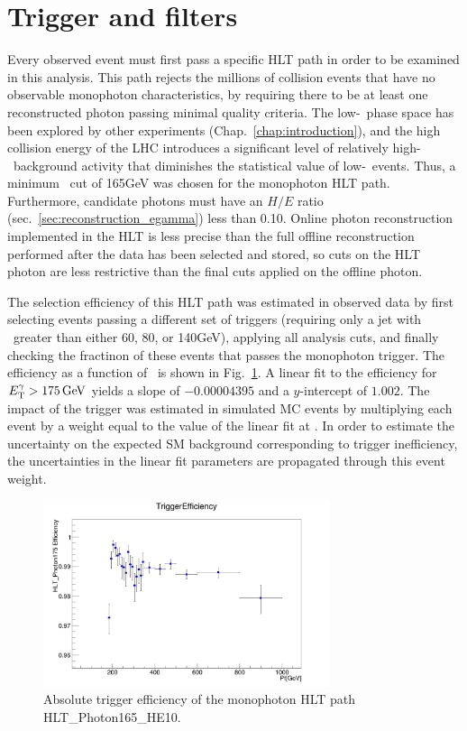 \section{Trigger and \texorpdfstring{\MET}{pTmiss} filters} \label{sec:event_selection_trigger_METfilters}
Every observed event must first pass a specific HLT path in order to be examined in this analysis. This path rejects the millions of collision events that have no observable
monophoton characteristics, by requiring there to be at least one reconstructed photon passing minimal quality criteria.
The low-\pTgamma\ phase space has been explored by other experiments (Chap.~\ref{chap:introduction}), and the high collision energy of the LHC introduces a significant
level of relatively high-\pT\ background activity that diminishes the statistical value of low-\pTgamma\ events.
Thus, a minimum \ETgamma\ cut of 165\unit{GeV} was chosen for the monophoton HLT path.
Furthermore, candidate photons must have an $H/E$ ratio (sec.~\ref{sec:reconstruction_egamma}) less than 0.10.
Online photon reconstruction implemented in the HLT is less precise than the full offline reconstruction performed after the data has been selected and stored,
so cuts on the HLT photon are less restrictive than the final cuts applied on the offline photon.

The selection efficiency of this HLT path was estimated in observed data by first selecting events passing a different set of triggers (requiring only a jet with \pT\ greater than
either 60, 80, or 140\unit{GeV}), applying all analysis cuts, and finally checking the fractinon of these events that passes the monophoton trigger.
The efficiency as a function of \ETgamma\ is shown in Fig.~\ref{fig:trigger_efficiency}.
A linear fit to the efficiency for $\ETgamma > 175\unit{GeV}$ yields a slope of $-0.00004395$ and a  $y$-intercept of $1.002$. The impact of the trigger was estimated
in simulated MC events by multiplying each event by a weight equal to the value of the linear fit at \ETgamma. In order to estimate the uncertainty on the expected
SM background corresponding to trigger inefficiency, the uncertainties in the linear fit parameters are propagated through this event weight.

\begin{figure}[hbtp]
  \begin{center}
    \includegraphics[width=0.75\textwidth]{Figures/triggereff_zoom.png}
    \caption{
    Absolute trigger efficiency of the monophoton HLT path HLT\_Photon165\_HE10.
    }
    \label{fig:trigger_efficiency}
  \end{center}
\end{figure}


